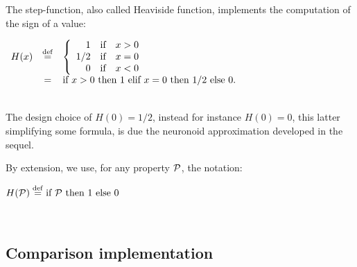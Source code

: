 \documentclass[a4]{article}
\newcommand{\eqline}[1]{~\vspace{0.1cm}\\\centerline{$#1$}\vspace{0.1cm}\\}
\newcommand{\defq}{\stackrel {\rm def}{=}}
\begin{document}
The step-function, also called Heaviside function, implements the computation of the sign of a value:
\eqline{\begin{array}{rcl}
    H(x) &\defq& \left\{ \begin{array}{rcl} 1 &\mbox{if}& x > 0\\ 1/2 &\mbox{if}& x = 0\\ 0 &\mbox{if}& x < 0\\ \end{array}\right. \\
    &=& \mbox{if } x > 0 \mbox{ then } 1 \mbox{ elif } x = 0 \mbox{ then } 1/2 \mbox{ else } 0. \\
\end{array}}
The design choice of $H(0) = 1/2$, instead for instance $H(0)=0$, this latter simplifying some formula, is due the neuronoid approximation developed in the sequel.

By extension, we use,  for any property ${\cal P}$, the notation:
\eqline{H({\cal P}) \defq \mbox{if } {\cal P} \mbox{ then } 1 \mbox{ else } 0}

\subsection{Comparison implementation}
\end{document}
